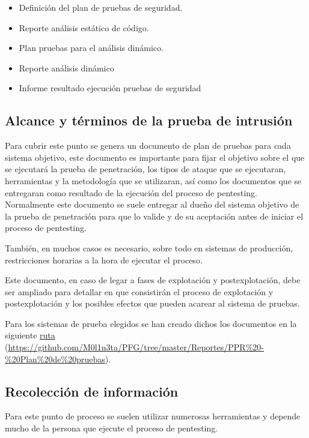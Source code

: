 \begin{itemize}
    \item Definición del plan de pruebas de seguridad.
    \item Reporte análisis estático de código.
    \item Plan pruebas para el análisis dinámico.
    \item Reporte análisis dinámico
    \item Informe resultado ejecución pruebas de seguridad
\end{itemize}

\subsection{Alcance y términos de la prueba de intrusión}
Para cubrir este punto se genera un documento de plan de pruebas para cada sistema objetivo, este documento es 
importante para fijar el objetivo sobre el que se ejecutará la prueba de penetración, 
los tipos de ataque que se ejecutaran, herramientas y la metodología que se utilizaran, así como los documentos que se entregaran 
como resultado de la ejecución del proceso de pentesting.\\

Normalmente este documento se suele entregar al dueño del sistema objetivo de la prueba de penetración para que 
lo valide y de su aceptación antes de iniciar el proceso de pentesting.

También, en muchos casos es necesario, sobre todo en sistemas de producción, restricciones horarias a la hora de ejecutar el proceso.

Este documento, en caso de legar a fases de explotación y postexplotación, debe ser ampliado para detallar en que consistirán el 
proceso de explotación y postexplotación y los posibles efectos que pueden acarear al sistema de pruebas.

Para los sistemas de prueba elegidos se han creado dichos los documentos en la siguiente 
\href{https://github.com/M0l1n3ta/PFG/tree/master/Reportes/PPR%20-%20Plan%20de%20pruebas}{ruta}
(\url{https://github.com/M0l1n3ta/PFG/tree/master/Reportes/PPR%20-%20Plan%20de%20pruebas}).

\subsection{Recolección de información}

Para este punto de proceso se suelen utilizar numerosas herramientas y depende mucho de la persona que ejecute 
el proceso de pentesting. 

